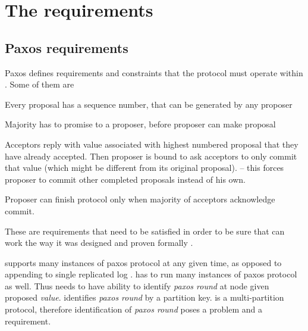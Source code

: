 
\section{The requirements}\label{sec:mpp:requirements}

\subsection{Paxos requirements}
Paxos defines requirements and constraints that the protocol must operate within \cite{lamport2001paxosMadeSimple}. Some of them are \begin{enumerate*}
  \item Every proposal has a sequence number, that can be generated by any proposer
  \item Majority has to promise to a proposer, before proposer can make proposal
  \item Acceptors reply with value associated with highest numbered proposal that they have already accepted. Then proposer is bound to ask acceptors to only commit that value (which might be different from its original proposal). -- this forces proposer to commit other completed proposals instead of his own.\label{sec:mpp:requirements:finishInProgress}
  \item Proposer can finish protocol only when majority of acceptors acknowledge commit.
\end{enumerate*}
These are requirements that need to be satisfied in order to be sure that \paxos can work the way it was designed and proven formally \cite{Lamport1998partTimeParliment}. 

\lwt supports many instances of paxos protocol at any given time, as opposed to appending to single replicated log \cite{chandra2007PaxosMadeLive}. \mpp has to run many instances of paxos protocol as well. Thus \mpp needs to have ability to identify \emph{paxos round} at node given proposed \emph{value}. \lwt identifies \emph{paxos round} by a partition key. \mpp is a multi-partition protocol, therefore identification of \emph{paxos round} poses a problem and a requirement. \label{sec:mpp:requirements:identifyRound}




